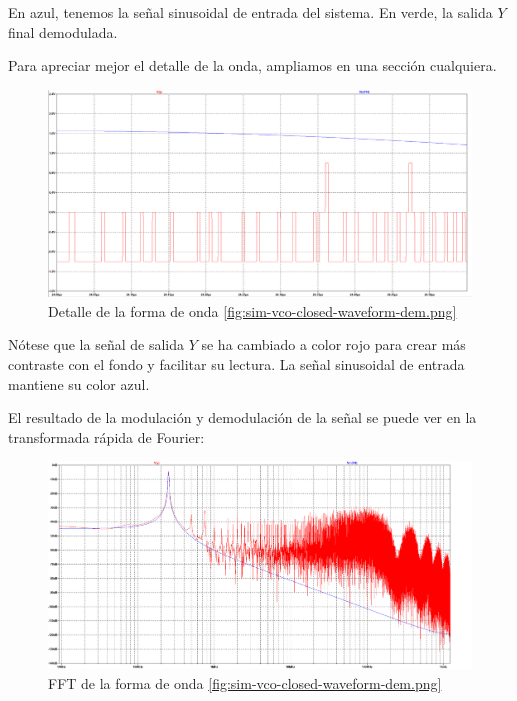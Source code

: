 \documentclass[12pt]{report} %
\begin{document}
	En azul, tenemos la señal sinusoidal de entrada del sistema. En verde, la salida $Y$ final demodulada.
	
	Para apreciar mejor el detalle de la onda, ampliamos en una sección cualquiera.
	
	\begin{figure}[H]
		\includegraphics[width=\textwidth]{sim-vco-closed-waveform-dem-zoom.png}
		\caption[Detalle de la forma de onda \ref{fig:sim-vco-closed-waveform-dem.png}]{Detalle de la forma de onda \ref{fig:sim-vco-closed-waveform-dem.png}}
		\label{fig:sim-vco-closed-waveform-dem-zoom.png}
	\end{figure}

	Nótese que la señal de salida $Y$ se ha cambiado a color rojo para crear más contraste con el fondo y facilitar su lectura. La señal sinusoidal de entrada mantiene su color azul.

	
	El resultado de la modulación y demodulación de la señal se puede ver en la transformada rápida de Fourier:
	
	\begin{figure}[H]
		\includegraphics[width=\textwidth]{sim-vco-closed-waveform-dem-fft.png}
		\caption[FFT de la forma de onda \ref{fig:sim-vco-closed-waveform-dem.png}]{FFT de la forma de onda \ref{fig:sim-vco-closed-waveform-dem.png}}
		\label{fig:sim-vco-closed-waveform-dem-fft.png}
	\end{figure}
	
\end{document}
